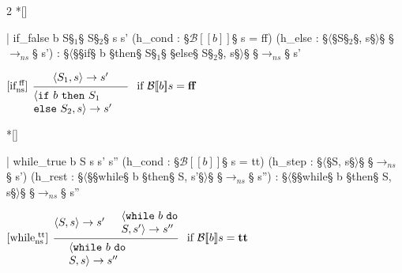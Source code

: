 \begin{paracol}{2}
\switchcolumn[1]*[]
\begin{leftcolumn}
    \begin{Lean_Code}
  | if_false {b S§$_{1}$§ S§$_{2}$§ s s'}
    (h_cond : §\(\mathcal{B}[\![b]\!]\)§ s = ff)
    (h_else : §\(\langle\)§S§\(_2\)§, s§\(\rangle\)§ §\(\to_{ns}\)§ s') :
    §\(\langle\)§§if§ b §then§ S§$_{1}$§ §else§ S§$_{2}$§, s§\(\rangle\)§
    §\(\to_{ns}\)§ s'
    \end{Lean_Code}
\end{leftcolumn}
\begin{rightcolumn}
\vspace{3.5em}
    \(
\begin{prooftree}
  \hypo{\langle S_1, s \rangle \to s'}
  \infer[
    left label={[if$_{\text{ns}}^{\text{\ ff}}$]}
    ]1[
    if $\mathcal{B}[\![b]\!]s = \mathbf{ff}$
    ]{
        \parbox{3cm}{$
    \langle \mathtt{if}\ b\ \mathtt{then}\ S_1\ \\ \mathtt{else}\ S_2, s \rangle
    \to s'
        $}
    }
\end{prooftree}
    \)
\end{rightcolumn}
\vspace{3em}
\switchcolumn[1]*[]
\begin{leftcolumn}
    \begin{Lean_Code}
  | while_true {b S s s' s''}
    (h_cond : §\(\mathcal{B}[\![b]\!]\)§ s = tt)
    (h_step : §\(\langle\)§S, s§\(\rangle\)§ §\(\to_{ns}\)§ s')
    (h_rest :
      §\(\langle\)§§while§ b §then§ S, s'§\(\rangle\)§
      §\(\to_{ns}\)§ s'') :
      §\(\langle\)§§while§ b §then§ S, s§\(\rangle\)§
      §\(\to_{ns}\)§ s''
    \end{Lean_Code}
\end{leftcolumn}
\begin{rightcolumn}
\vspace{5.4em}
    \(
\begin{prooftree}
  \hypo{\langle S, s \rangle \to s'}
  \hypo{
        \parbox{1.8cm}{$
    \langle \mathtt{while}\ b\ \mathtt{do}\ \\
    S, s' \rangle \to s''
        $}
    }
  \infer[
      left label={[while$_{\text{ns}}^{\text{\ tt}}$]}
      ]2[
      if $\mathcal{B}[\![b]\!]s = \mathbf{tt}$
      ]{
        \parbox{3cm}{$
    \langle \mathtt{while}\ b\ \mathtt{do}\ \\
    S, s \rangle \to s''
        $}
    }
\end{prooftree}
    \)
\end{rightcolumn}
\vspace{2em}

\end{paracol}

